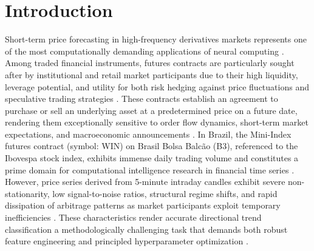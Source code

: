 
\section{Introduction}\label{sec:introduction}

Short-term price forecasting in high-frequency derivatives markets represents one of the most computationally demanding applications of neural computing \cite{bashir2026evobagnet, jesus2025tda}. Among traded financial instruments, futures contracts are particularly sought after by institutional and retail market participants due to their high liquidity, leverage potential, and utility for both risk hedging against price fluctuations and speculative trading strategies \cite{souza2025iccsa, al_bannoud2026accelerating}. These contracts establish an agreement to purchase or sell an underlying asset at a predetermined price on a future date, rendering them exceptionally sensitive to order flow dynamics, short-term market expectations, and macroeconomic announcements \cite{jarrow1981forward, cardoso2022bovdb}. In Brazil, the Mini-Index futures contract (symbol: WIN) on Brasil Bolsa Balc\~{a}o (B3), referenced to the Ibovespa stock index, exhibits immense daily trading volume and constitutes a prime domain for computational intelligence research in financial time series \cite{souza2024dataset, bashir2026evobagnet}. However, price series derived from 5-minute intraday candles exhibit severe non-stationarity, low signal-to-noise ratios, structural regime shifts, and rapid dissipation of arbitrage patterns as market participants exploit temporary inefficiencies \cite{makridakis2018statistical, dhingra2025solar}. These characteristics render accurate directional trend classification a methodologically challenging task that demands both robust feature engineering and principled hyperparameter optimization \cite{billah2024nca_moving_average}.


